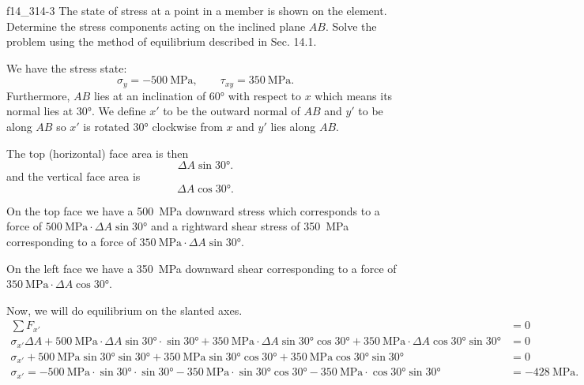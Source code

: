 
\begin{problemwithimage}{f14_3}{14-3}
  The state of stress at a point in a member is shown on the element.
  Determine the stress components acting on the inclined plane $AB$.
  Solve the problem using the method of equilibrium described in Sec. 14.1.
\end{problemwithimage}

\begin{derivation}
  We have the stress state:
  \begin{equation*}
    \sigma_y = \qty{-500}{\MPa}, \qquad \tau_{xy} = \qty{350}{\MPa}
  .\end{equation*}
  Furthermore, $AB$ lies at an inclination of \ang{60} with respect to $x$ which means its normal lies at \ang{30}.
  We define $x'$ to be the outward normal of $AB$ and $y'$ to be along $AB$ so $x'$ is rotated \ang{30} clockwise from $x$ and $y'$ lies along $AB$.

  The top (horizontal) face area is then
  \begin{equation*}
    \Delta A \sin \ang{30} 
  .\end{equation*}
  and the vertical face area is
  \begin{equation*}
    \Delta A \cos \ang{30} 
  .\end{equation*}
  
  On the top face we have a \qty{500}{\MPa} downward stress which corresponds to a force of $\qty{500}{\MPa} \cdot \Delta A \sin \ang{30}$ and a rightward shear stress of \qty{350}{\MPa} corresponding to a force of $\qty{350}{\MPa} \cdot \Delta A \sin \ang{30} $.

  On the left face we have a \qty{350}{\MPa} downward shear corresponding to a force of $\qty{350}{\MPa} \cdot \Delta A \cos \ang{30}$.

  Now, we will do equilibrium on the slanted axes. 
  \begin{align*}
    \sum F_{x'} &= 0 \\
    \sigma_{x'} \Delta A + \qty{500}{\MPa} \cdot \Delta A \sin \ang{30} \cdot \sin \ang{30} + \qty{350}{\MPa} \cdot \Delta A \sin \ang{30} \cos \ang{30} + \qty{350}{\MPa} \cdot \Delta A \cos \ang{30} \sin \ang{30} &= 0 \\
    \sigma_{x'} + \qty{500}{\MPa} \sin \ang{30} \sin \ang{30}  + \qty{350}{\MPa} \sin \ang{30} \cos \ang{30} + \qty{350}{\MPa} \cos \ang{30} \sin \ang{30} &= 0 \\
    \sigma_{x'} = - \qty{500}{\MPa} \cdot \sin \ang{30} \cdot \sin \ang{30} - \qty{350}{\MPa} \cdot \sin \ang{30} \cos \ang{30} - \qty{350}{\MPa} \cdot \cos \ang{30} \sin \ang{30}  &= \qty{-428}{\MPa}
  .\end{align*}


\end{derivation}
